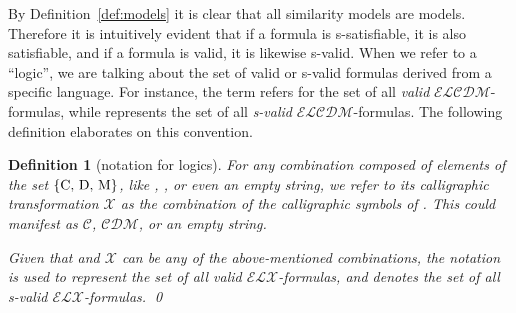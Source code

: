 \documentclass{article}
\newtheorem{definition}[theorem]{Definition}%
\newcommand{\langcdm}{\ensuremath{\mathcal{ELCDM}}\xspace}
\newcommand{\lcdm}{\text{\normalfont ELCDM}\xspace}
\newcommand{\lscdm}{\text{\normalfont ELCDM$^s$}\xspace}
\begin{document}
By Definition~\ref{def:models} it is clear that all similarity models are models. Therefore  it is intuitively evident that if a formula is s-satisfiable, it is also satisfiable, and if a formula is valid, it is likewise s-valid. When we refer to a ``logic'', we are talking about the set of valid or s-valid formulas derived from a specific language. For instance, the term \lcdm refers for the set of all \emph{valid} \langcdm-formulas, while \lscdm represents the set of all \emph{s-valid} \langcdm-formulas. The following definition elaborates on this convention.

\begin{definition}[notation for logics]
For any combination  composed of elements of the set $\{\text{\normalfont C, D, M}\}$, like , , or even an empty string, we refer to its calligraphic transformation $\mathcal{X}$ as the combination of the calligraphic symbols of . This could manifest as $\mathcal{C}$, $\mathcal{CDM}$, or an empty string.

Given that  and $\mathcal{X}$ can be any of the above-mentioned combinations, the notation  is used to represent the set of all valid $\mathcal{ELX}$-formulas, and  denotes the set of all s-valid $\mathcal{ELX}$-formulas.
\qed
\end{definition}
\end{document}
